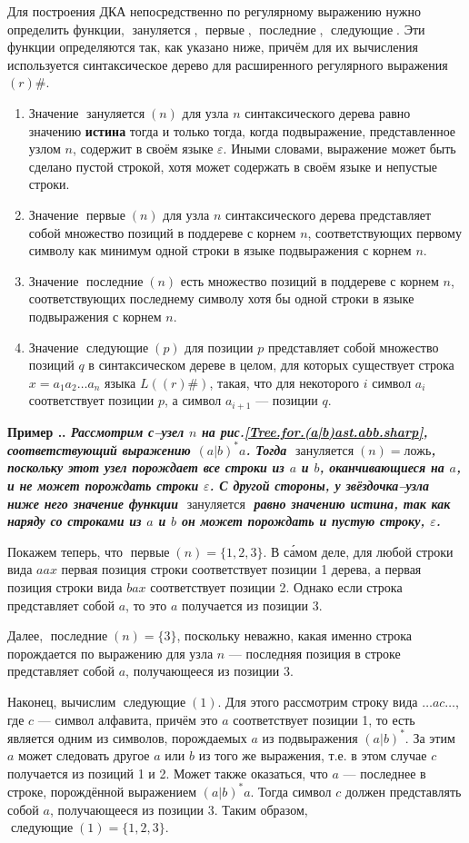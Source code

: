 \documentclass[10pt]{report}
\newcounter{exam}[section]
\renewcommand{\theexam}{\thesection.\arabic{exam}}
\newenvironment{Example}{\par\refstepcounter{exam}\bf Пример \theexam. \sl}{\rm\par}
\newcommand{\nullable}{\mathop{\textit{зануляется}}}
\newcommand{\firstpos}{\mathop{\textit{первые}}}
\newcommand{\lastpos}{\mathop{\textit{последние}}}
\newcommand{\followpos}{\mathop{\textit{следующие}}}
\begin{document}
Для построения ДКА непосредственно по регулярному выражению нужно определить функции,  $\nullable$, $\firstpos$, $\lastpos$, $\followpos$. Эти функции
определяются так, как указано ниже, причём для их вычисления используется синтаксическое дерево для расширенного регулярного выражения $(r)\#$.
\begin{enumerate}
    \item Значение $\nullable(n)$ для узла $n$ синтаксического дерева равно значению \textbf{истина} тогда и только тогда, когда подвыражение, представленное узлом $n$, содержит в своём
языке $\varepsilon$. Иными словами, выражение может быть сделано пустой строкой, хотя может содержать в своём языке и непустые строки.
    \item Значение $\firstpos(n)$ для узла $n$ синтаксического дерева представляет собой множество позиций в поддереве с корнем $n$, соответствующих первому символу как минимум одной
строки в языке подвыражения с корнем $n$.
    \item Значение $\lastpos(n)$ есть множество позиций в поддереве с корнем $n$, соответствующих последнему символу хотя бы одной строки в языке подвыражения с корнем $n$.
    \item Значение $\followpos(p)$ для позиции $p$ представляет собой множество позиций $q$ в синтаксическом дереве в целом, для которых существует строка $x=a_1a_2\dots a_n$ языка
$L((r)\#)$, такая, что для некоторого $i$ символ $a_i$ соответствует позиции $p$, а символ $a_{i+1}$ --- позиции $q$.
\end{enumerate}

\begin{Example}Рассмотрим с--узел $n$ на рис.\ref{Tree.for.(a|b)ast.abb.sharp}, соответствующий выражению $(a|b)^*a$. Тогда $\nullable(n)=\textbf{ложь}$, поскольку этот узел порождает все строки из
$a$ и $b$, оканчивающиеся на $a$, и не может порождать строки $\varepsilon$. С другой стороны, у звёздочка--узла ниже него значение функции $\nullable$ равно значению \textbf{истина}, так
как наряду со строками из $a$ и $b$ он может порождать и пустую строку, $\varepsilon$.

Покажем теперь, что $\firstpos(n)=\{1,2,3\}$. В с\'{а}мом деле, для любой строки вида $aax$ первая позиция строки соответствует позиции 1 дерева, а первая позиция строки вида $bax$
соответствует позиции 2. Однако если строка представляет собой $a$, то это $a$ получается из позиции 3.

Далее, $\lastpos(n)=\{3\}$, поскольку неважно, какая именно строка порождается по выражению для узла $n$ --- последняя позиция в строке представляет собой $a$, получающееся из позиции 3.

Наконец, вычислим $\followpos(1)$. Для этого рассмотрим строку вида $\dots ac\dots$, где $c$ --- символ алфавита, причём это $a$ соответствует позиции 1, то есть является одним из
символов, порождаемых $a$ из подвыражения $(a|b)^*$. За этим $a$ может следовать другое $a$ или $b$ из того же выражения, т.е. в этом случае $c$ получается из позиций 1 и 2. Может также
оказаться, что $a$ --- последнее в строке, порождённой выражением $(a|b)^*a$. Тогда символ $c$ должен представлять собой $a$, получающееся из позиции 3. Таким образом,
$\followpos(1)=\{1,2,3\}$.
\end{Example}
\end{document}
